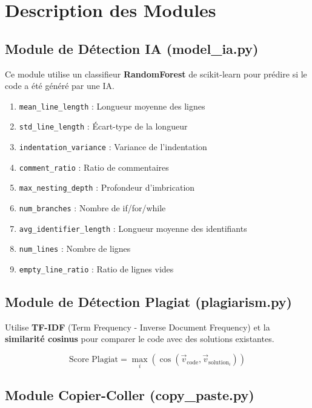 \documentclass[12pt,a4paper]{report}
\begin{document}
\section{Description des Modules}

\subsection{Module de Détection IA (model\_ia.py)}

Ce module utilise un classifieur \textbf{RandomForest} de scikit-learn pour prédire si le code a été généré par une IA.

\begin{infobox}
\begin{enumerate}
    \item \texttt{mean\_line\_length} : Longueur moyenne des lignes
    \item \texttt{std\_line\_length} : Écart-type de la longueur
    \item \texttt{indentation\_variance} : Variance de l'indentation
    \item \texttt{comment\_ratio} : Ratio de commentaires
    \item \texttt{max\_nesting\_depth} : Profondeur d'imbrication
    \item \texttt{num\_branches} : Nombre de if/for/while
    \item \texttt{avg\_identifier\_length} : Longueur moyenne des identifiants
    \item \texttt{num\_lines} : Nombre de lignes
    \item \texttt{empty\_line\_ratio} : Ratio de lignes vides
\end{enumerate}
\end{infobox}

\subsection{Module de Détection Plagiat (plagiarism.py)}

Utilise \textbf{TF-IDF} (Term Frequency - Inverse Document Frequency) et la \textbf{similarité cosinus} pour comparer le code avec des solutions existantes.

\begin{equation}
\text{Score Plagiat} = \max_{i} \left( \cos(\vec{v}_{\text{code}}, \vec{v}_{\text{solution}_i}) \right)
\end{equation}

\subsection{Module Copier-Coller (copy\_paste.py)}
\end{document}
